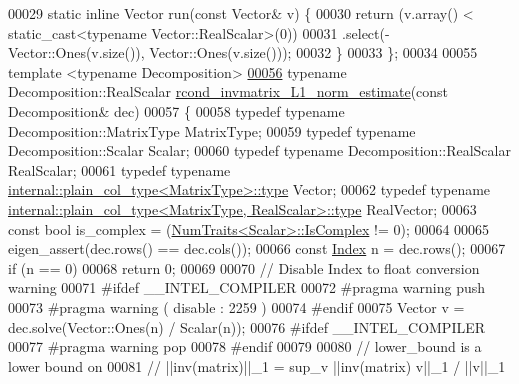 \begin{DoxyCode}
00029   \textcolor{keyword}{static} \textcolor{keyword}{inline} Vector run(\textcolor{keyword}{const} Vector& v) \{
00030     \textcolor{keywordflow}{return} (v.array() < \textcolor{keyword}{static\_cast<}typename Vector::RealScalar\textcolor{keyword}{>}(0))
00031            .select(-Vector::Ones(v.size()), Vector::Ones(v.size()));
00032   \}
00033 \};
00034 
00055 \textcolor{keyword}{template} <\textcolor{keyword}{typename} Decomposition>
\hyperlink{namespace_eigen_1_1internal_aa3f5b3cfa34df750994a247d4823aa51}{00056} \textcolor{keyword}{typename} Decomposition::RealScalar \hyperlink{namespace_eigen_1_1internal_aa3f5b3cfa34df750994a247d4823aa51}{rcond\_invmatrix\_L1\_norm\_estimate}(\textcolor{keyword}{const} 
      Decomposition& dec)
00057 \{
00058   \textcolor{keyword}{typedef} \textcolor{keyword}{typename} Decomposition::MatrixType MatrixType;
00059   \textcolor{keyword}{typedef} \textcolor{keyword}{typename} Decomposition::Scalar Scalar;
00060   \textcolor{keyword}{typedef} \textcolor{keyword}{typename} Decomposition::RealScalar RealScalar;
00061   \textcolor{keyword}{typedef} \textcolor{keyword}{typename} \hyperlink{class_eigen_1_1internal_1_1_tensor_lazy_evaluator_writable}{internal::plain\_col\_type<MatrixType>::type} 
      Vector;
00062   \textcolor{keyword}{typedef} \textcolor{keyword}{typename} \hyperlink{class_eigen_1_1internal_1_1_tensor_lazy_evaluator_writable}{internal::plain\_col\_type<MatrixType, RealScalar>::type}
       RealVector;
00063   \textcolor{keyword}{const} \textcolor{keywordtype}{bool} is\_complex = (\hyperlink{group___core___module_struct_eigen_1_1_num_traits}{NumTraits<Scalar>::IsComplex} != 0);
00064 
00065   eigen\_assert(dec.rows() == dec.cols());
00066   \textcolor{keyword}{const} \hyperlink{namespace_eigen_a62e77e0933482dafde8fe197d9a2cfde}{Index} n = dec.rows();
00067   \textcolor{keywordflow}{if} (n == 0)
00068     \textcolor{keywordflow}{return} 0;
00069 
00070   \textcolor{comment}{// Disable Index to float conversion warning}
00071 \textcolor{preprocessor}{#ifdef \_\_INTEL\_COMPILER}
00072 \textcolor{preprocessor}{  #pragma warning push}
00073 \textcolor{preprocessor}{  #pragma warning ( disable : 2259 )}
00074 \textcolor{preprocessor}{#endif}
00075   Vector v = dec.solve(Vector::Ones(n) / Scalar(n));
00076 \textcolor{preprocessor}{#ifdef \_\_INTEL\_COMPILER}
00077 \textcolor{preprocessor}{  #pragma warning pop}
00078 \textcolor{preprocessor}{#endif}
00079 
00080   \textcolor{comment}{// lower\_bound is a lower bound on}
00081   \textcolor{comment}{//   ||inv(matrix)||\_1  = sup\_v ||inv(matrix) v||\_1 / ||v||\_1}

\end{DoxyCode}
